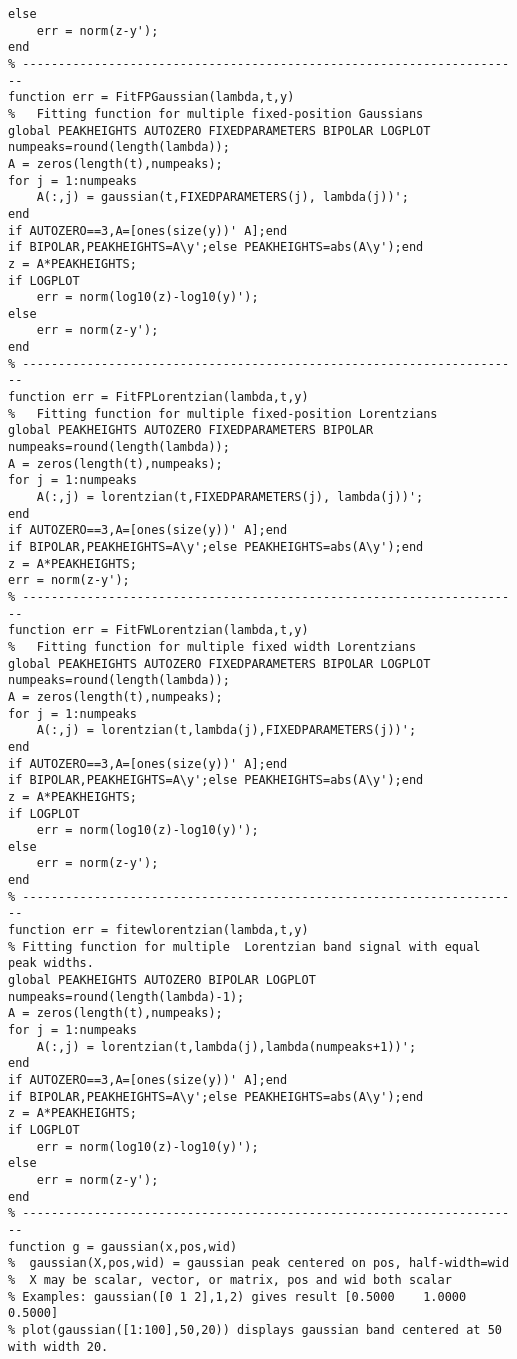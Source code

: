 \begin{lstlisting}
else
    err = norm(z-y');
end
% ----------------------------------------------------------------------
function err = FitFPGaussian(lambda,t,y)
%	Fitting function for multiple fixed-position Gaussians
global PEAKHEIGHTS AUTOZERO FIXEDPARAMETERS BIPOLAR LOGPLOT
numpeaks=round(length(lambda));
A = zeros(length(t),numpeaks);
for j = 1:numpeaks
    A(:,j) = gaussian(t,FIXEDPARAMETERS(j), lambda(j))';
end
if AUTOZERO==3,A=[ones(size(y))' A];end
if BIPOLAR,PEAKHEIGHTS=A\y';else PEAKHEIGHTS=abs(A\y');end
z = A*PEAKHEIGHTS;
if LOGPLOT
    err = norm(log10(z)-log10(y)');
else
    err = norm(z-y');
end
% ----------------------------------------------------------------------
function err = FitFPLorentzian(lambda,t,y)
%	Fitting function for multiple fixed-position Lorentzians
global PEAKHEIGHTS AUTOZERO FIXEDPARAMETERS BIPOLAR
numpeaks=round(length(lambda));
A = zeros(length(t),numpeaks);
for j = 1:numpeaks
    A(:,j) = lorentzian(t,FIXEDPARAMETERS(j), lambda(j))';
end
if AUTOZERO==3,A=[ones(size(y))' A];end
if BIPOLAR,PEAKHEIGHTS=A\y';else PEAKHEIGHTS=abs(A\y');end
z = A*PEAKHEIGHTS;
err = norm(z-y');
% ----------------------------------------------------------------------
function err = FitFWLorentzian(lambda,t,y)
%	Fitting function for multiple fixed width Lorentzians
global PEAKHEIGHTS AUTOZERO FIXEDPARAMETERS BIPOLAR LOGPLOT
numpeaks=round(length(lambda));
A = zeros(length(t),numpeaks);
for j = 1:numpeaks
    A(:,j) = lorentzian(t,lambda(j),FIXEDPARAMETERS(j))';
end
if AUTOZERO==3,A=[ones(size(y))' A];end
if BIPOLAR,PEAKHEIGHTS=A\y';else PEAKHEIGHTS=abs(A\y');end
z = A*PEAKHEIGHTS;
if LOGPLOT
    err = norm(log10(z)-log10(y)');
else
    err = norm(z-y');
end
% ----------------------------------------------------------------------
function err = fitewlorentzian(lambda,t,y)
% Fitting function for multiple  Lorentzian band signal with equal peak widths.
global PEAKHEIGHTS AUTOZERO BIPOLAR LOGPLOT
numpeaks=round(length(lambda)-1);
A = zeros(length(t),numpeaks);
for j = 1:numpeaks
    A(:,j) = lorentzian(t,lambda(j),lambda(numpeaks+1))';
end
if AUTOZERO==3,A=[ones(size(y))' A];end
if BIPOLAR,PEAKHEIGHTS=A\y';else PEAKHEIGHTS=abs(A\y');end
z = A*PEAKHEIGHTS;
if LOGPLOT
    err = norm(log10(z)-log10(y)');
else
    err = norm(z-y');
end
% ----------------------------------------------------------------------
function g = gaussian(x,pos,wid)
%  gaussian(X,pos,wid) = gaussian peak centered on pos, half-width=wid
%  X may be scalar, vector, or matrix, pos and wid both scalar
% Examples: gaussian([0 1 2],1,2) gives result [0.5000    1.0000    0.5000]
% plot(gaussian([1:100],50,20)) displays gaussian band centered at 50 with width 20.

\end{lstlisting}
